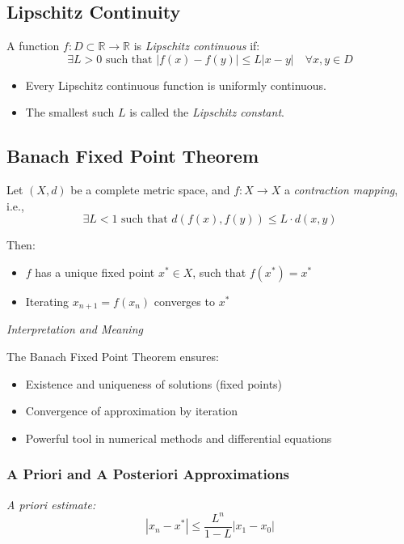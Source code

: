 \subsection{Lipschitz Continuity}

A function \(f: D \subset \mathbb{R} \to \mathbb{R}\) is \emph{Lipschitz continuous} if:
\[
\exists L > 0 \text{ such that } |f(x) - f(y)| \le L |x - y| \quad \forall x, y \in D
\]

\begin{itemize}[label=\(-\)]
\item Every Lipschitz continuous function is uniformly continuous.
\item The smallest such \(L\) is called the \emph{Lipschitz constant}.
\end{itemize}

\subsection{Banach Fixed Point Theorem}

Let \((X, d)\) be a complete metric space, and \(f: X \to X\) a \emph{contraction mapping}, i.e.,
\[
\exists L < 1 \text{ such that } d(f(x), f(y)) \le L \cdot d(x, y)
\]

Then:
\begin{itemize}[label=\(-\)]
\item \(f\) has a unique fixed point \(x^* \in X\), such that \(f(x^*) = x^*\)
\item Iterating \(x_{n+1} = f(x_n)\) converges to \(x^*\)
\end{itemize}

\emph{Interpretation and Meaning}

The Banach Fixed Point Theorem ensures:
\begin{itemize}[label=\(-\)]
\item Existence and uniqueness of solutions (fixed points)
\item Convergence of approximation by iteration
\item Powerful tool in numerical methods and differential equations
\end{itemize}

\subsubsection{A Priori and A Posteriori Approximations}

\emph{A priori estimate:}
\[
|x_n - x^*| \le \frac{L^n}{1 - L} |x_1 - x_0|
\]

